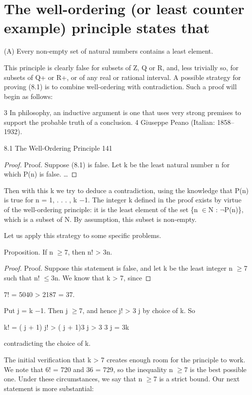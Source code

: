 \documentclass[11pt]{article}
\theoremstyle{plain}
\theoremstyle{definition}
\begin{document}
\section{The well-ordering (or least counter example) principle states that}

(A) Every non-empty set of natural numbers contains a least element.

This principle is clearly false for subsets of Z, Q or R, and, less trivially so, for subsets of Q+ or R+, or of any real or rational interval. A possible strategy for proving (8.1) is to combine well-ordering with contradiction. Such a proof will begin as follows:

3 In philosophy, an inductive argument is one that uses very strong premises to support the probable truth of a conclusion. 4 Giuseppe Peano (Italian: 1858--1932).

8.1 The Well-Ordering Principle 141

\begin{proof}
Proof. Suppose (8.1) is false. Let k be the least natural number n for which P(n) is false. \dots{}
\end{proof}

Then with this k we try to deduce a contradiction, using the knowledge that P(n) is true for n = 1, . . . , k $-$1. The integer k defined in the proof exists by virtue of the well-ordering principle: it is the least element of the set \{n $\in$N : $\neg$P(n)\}, which is a subset of N. By assumption, this subset is non-empty.

Let us apply this strategy to some specific problems.

Proposition. If n $\geq$7, then n! > 3n.

\begin{proof}
Proof. Suppose this statement is false, and let k be the least integer n $\geq$7 such that n! $\leq$3n. We know that k > 7, since
\end{proof}

7! = 5040 > 2187 = 37.

Put j = k $-$1. Then j $\geq$7, and hence j! > 3 j by choice of k. So

k! = ( j + 1) j! > ( j + 1)3 j > 3 \textperiodcentered{} 3 j = 3k

contradicting the choice of k. 

The initial verification that k > 7 creates enough room for the principle to work. We note that 6! = 720 and 36 = 729, so the inequality n $\geq$7 is the best possible one. Under these circumstances, we say that n $\geq$7 is a strict bound. Our next statement is more substantial:
\end{document}
